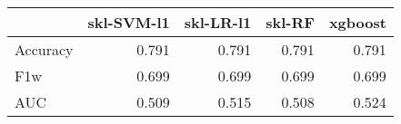 \begin{tabular}{lrrrr}
\toprule
{} &  skl-SVM-l1 &  skl-LR-l1 &  skl-RF &  xgboost \\
\midrule
Accuracy &       0.791 &      0.791 &   0.791 &    0.791 \\
F1w      &       0.699 &      0.699 &   0.699 &    0.699 \\
AUC      &       0.509 &      0.515 &   0.508 &    0.524 \\
\bottomrule
\end{tabular}
